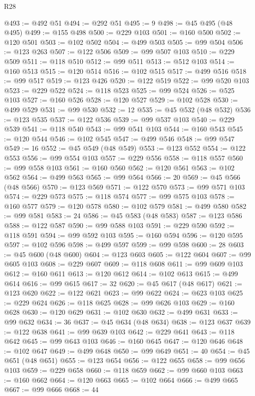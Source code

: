 \begin{lexlean}{R28}
\begin{coremodule}
@493 := @492 @51
@494 := @292 @51
@495 := 9
@498 := @45 @495 (@48 @495)
@499 := @155 @498
@500 := @229 @103
@501 := @160 @500
@502 := @120 @501
@503 := @102 @502
@504 := @499 @503
@505 := @99 @504
@506 := @123 @263
@507 := @122 @506
@509 := @99 @507 @103
@510 := @229 @509
@511 := @118 @510
@512 := @99 @511
@513 := @512 @103
@514 := @160 @513
@515 := @120 @514
@516 := @102 @515
@517 := @499 @516
@518 := @99 @517
@519 := @123 @426
@520 := @122 @519
@522 := @99 @520 @103
@523 := @229 @522
@524 := @118 @523
@525 := @99 @524
@526 := @525 @103
@527 := @160 @526
@528 := @120 @527
@529 := @102 @528
@530 := @499 @529
@531 := @99 @530
@532 := 12
@535 := @45 @532 (@48 @532)
@536 := @123 @535
@537 := @122 @536
@539 := @99 @537 @103
@540 := @229 @539
@541 := @118 @540
@543 := @99 @541 @103
@544 := @160 @543
@545 := @120 @544
@546 := @102 @545
@547 := @499 @546
@548 := @99 @547
@549 := 16
@552 := @45 @549 (@48 @549)
@553 := @123 @552
@554 := @122 @553
@556 := @99 @554 @103
@557 := @229 @556
@558 := @118 @557
@560 := @99 @558 @103
@561 := @160 @560
@562 := @120 @561
@563 := @102 @562
@564 := @499 @563
@565 := @99 @564
@566 := 20
@569 := @45 @566 (@48 @566)
@570 := @123 @569
@571 := @122 @570
@573 := @99 @571 @103
@574 := @229 @573
@575 := @118 @574
@577 := @99 @575 @103
@578 := @160 @577
@579 := @120 @578
@580 := @102 @579
@581 := @499 @580
@582 := @99 @581
@583 := 24
@586 := @45 @583 (@48 @583)
@587 := @123 @586
@588 := @122 @587
@590 := @99 @588 @103
@591 := @229 @590
@592 := @118 @591
@594 := @99 @592 @103
@595 := @160 @594
@596 := @120 @595
@597 := @102 @596
@598 := @499 @597
@599 := @99 @598
@600 := 28
@603 := @45 @600 (@48 @600)
@604 := @123 @603
@605 := @122 @604
@607 := @99 @605 @103
@608 := @229 @607
@609 := @118 @608
@611 := @99 @609 @103
@612 := @160 @611
@613 := @120 @612
@614 := @102 @613
@615 := @499 @614
@616 := @99 @615
@617 := 32
@620 := @45 @617 (@48 @617)
@621 := @123 @620
@622 := @122 @621
@623 := @99 @622
@624 := @623 @103
@625 := @229 @624
@626 := @118 @625
@628 := @99 @626 @103
@629 := @160 @628
@630 := @120 @629
@631 := @102 @630
@632 := @499 @631
@633 := @99 @632
@634 := 36
@637 := @45 @634 (@48 @634)
@638 := @123 @637
@639 := @122 @638
@641 := @99 @639 @103
@642 := @229 @641
@643 := @118 @642
@645 := @99 @643 @103
@646 := @160 @645
@647 := @120 @646
@648 := @102 @647
@649 := @499 @648
@650 := @99 @649
@651 := 40
@654 := @45 @651 (@48 @651)
@655 := @123 @654
@656 := @122 @655
@658 := @99 @656 @103
@659 := @229 @658
@660 := @118 @659
@662 := @99 @660 @103
@663 := @160 @662
@664 := @120 @663
@665 := @102 @664
@666 := @499 @665
@667 := @99 @666
@668 := 44

\end{coremodule}
\end{lexlean}
